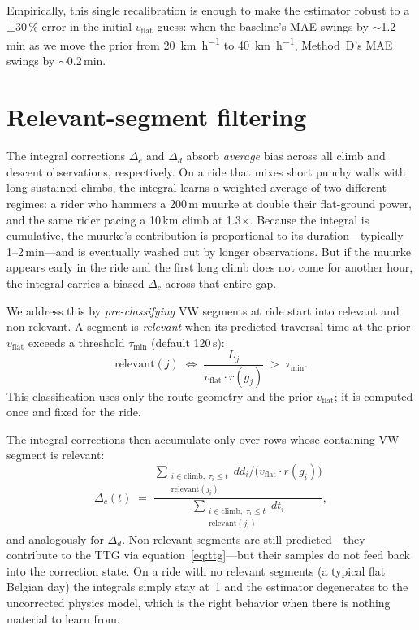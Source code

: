 \documentclass[11pt,a4paper]{article}
\begin{document}
Empirically, this single recalibration is enough to make the
estimator robust to a $\pm$30\,\% error in the initial
$v_{\text{flat}}$ guess: when the baseline's MAE swings by
$\sim$1.2\,\si{\minute} as we move the prior from \SI{20}{\km\per\hour}
to \SI{40}{\km\per\hour}, Method~D's MAE swings by
$\sim$0.2\,\si{\minute}.

\section{Relevant-segment filtering}
\label{sec:relevant}

The integral corrections $\Delta_c$ and $\Delta_d$ absorb
\emph{average} bias across all climb and descent observations,
respectively. On a ride that mixes short punchy walls with long
sustained climbs, the integral learns a weighted average of two
different regimes: a rider who hammers a 200\,\si{\metre} muurke at
double their flat-ground power, and the same rider pacing a
10\,\si{\km} climb at 1.3$\times$. Because the integral is
cumulative, the muurke's contribution is proportional to its
duration---typically 1--2\,\si{\minute}---and is eventually washed
out by longer observations. But if the muurke appears early in the
ride and the first long climb does not come for another hour, the
integral carries a biased $\Delta_c$ across that entire gap.

We address this by \emph{pre-classifying} VW segments at ride start
into relevant and non-relevant. A segment is \emph{relevant} when its
predicted traversal time at the prior $v_\text{flat}$ exceeds a
threshold $\tau_\text{min}$ (default 120\,\si{\second}):
\begin{equation}
\label{eq:relevant}
\text{relevant}(j)
\;\iff\;
\frac{L_j}{v_\text{flat} \cdot r(g_j)}
\;>\; \tau_\text{min}.
\end{equation}
This classification uses only the route geometry and the prior
$v_\text{flat}$; it is computed once and fixed for the ride.

The integral corrections then accumulate only over rows whose
containing VW segment is relevant:
\begin{equation}
\Delta_c(t) \;=\;
\frac{\displaystyle\sum_{\substack{i \in \text{climb},\;\tau_i \le t \\ \text{relevant}(j_i)}}
  dd_i / \bigl(v_\text{flat} \cdot r(g_i)\bigr)}
     {\displaystyle\sum_{\substack{i \in \text{climb},\;\tau_i \le t \\ \text{relevant}(j_i)}} dt_i},
\end{equation}
and analogously for $\Delta_d$. Non-relevant segments are still
predicted---they contribute to the TTG via
equation~\eqref{eq:ttg}---but their samples do not feed back into
the correction state. On a ride with no relevant segments (a typical
flat Belgian day) the integrals simply stay at~1 and the estimator
degenerates to the uncorrected physics model, which is the right
behavior when there is nothing material to learn from.
\end{document}
